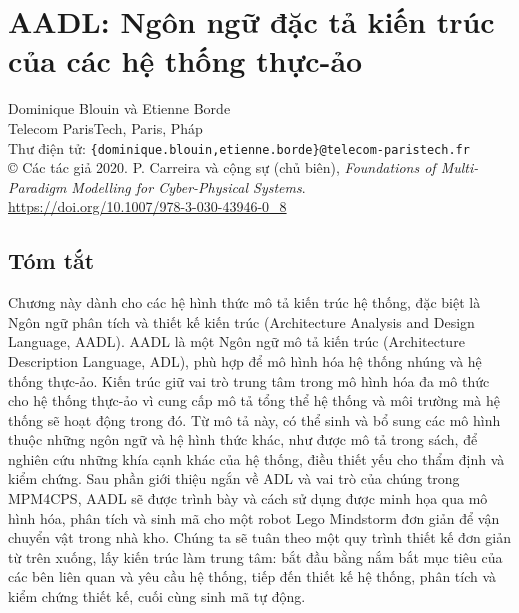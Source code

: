 \chapter{AADL: Ngôn ngữ đặc tả kiến trúc của các hệ thống thực-ảo}
\begin{flushleft}
\small
Dominique Blouin và Etienne Borde\\
Telecom ParisTech, Paris, Pháp\\
Thư điện tử: \texttt{\{dominique.blouin,etienne.borde\}@telecom-paristech.fr}\\
\copyright{} Các tác giả 2020. P. Carreira và cộng sự (chủ biên), \emph{Foundations of Multi-Paradigm Modelling for Cyber-Physical Systems}.\\
\url{https://doi.org/10.1007/978-3-030-43946-0_8}
\end{flushleft}

\section*{Tóm tắt}
Chương này dành cho các hệ hình thức mô tả kiến trúc hệ thống, đặc biệt là Ngôn ngữ phân tích và thiết kế kiến trúc (Architecture Analysis and Design Language, AADL). AADL là một Ngôn ngữ mô tả kiến trúc (Architecture Description Language, ADL), phù hợp để mô hình hóa hệ thống nhúng và hệ thống thực-ảo. Kiến trúc giữ vai trò trung tâm trong mô hình hóa đa mô thức cho hệ thống thực-ảo vì cung cấp mô tả tổng thể hệ thống và môi trường mà hệ thống sẽ hoạt động trong đó. Từ mô tả này, có thể sinh và bổ sung các mô hình thuộc những ngôn ngữ và hệ hình thức khác, như được mô tả trong sách, để nghiên cứu những khía cạnh khác của hệ thống, điều thiết yếu cho thẩm định và kiểm chứng. Sau phần giới thiệu ngắn về ADL và vai trò của chúng trong MPM4CPS, AADL sẽ được trình bày và cách sử dụng được minh họa qua mô hình hóa, phân tích và sinh mã cho một robot Lego Mindstorm đơn giản để vận chuyển vật trong nhà kho. Chúng ta sẽ tuân theo một quy trình thiết kế đơn giản từ trên xuống, lấy kiến trúc làm trung tâm: bắt đầu bằng nắm bắt mục tiêu của các bên liên quan và yêu cầu hệ thống, tiếp đến thiết kế hệ thống, phân tích và kiểm chứng thiết kế, cuối cùng sinh mã tự động.


